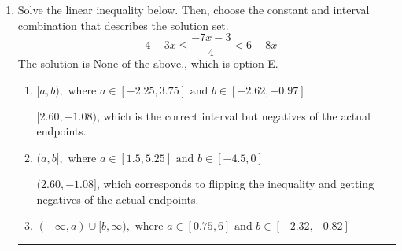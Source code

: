 \documentclass{extbook}[14pt]
\newcommand{\litem}[1]{\item #1

\rule{\textwidth}{0.4pt}}
\begin{document}
\begin{enumerate}
{\begin{enumerate}[label=\Alph*.]
$[15.50, 3.71)$, which corresponds to flipping the inequality and getting negatives of the actual endpoints.
\item \( (-\infty, a) \cup [b, \infty), \text{ where } a \in [13.5, 21] \text{ and } b \in [2.25, 5.25] \)

$(-\infty, 15.50) \cup [3.71, \infty)$, which corresponds to displaying the and-inequality as an or-inequality and getting negatives of the actual endpoints.
\item \( (a, b], \text{ where } a \in [12, 18.75] \text{ and } b \in [3, 6.75] \)

$(15.50, 3.71]$, which is the correct interval but negatives of the actual endpoints.
\item \( (-\infty, a] \cup (b, \infty), \text{ where } a \in [12.75, 18] \text{ and } b \in [-0.75, 11.25] \)

$(-\infty, 15.50] \cup (3.71, \infty)$, which corresponds to displaying the and-inequality as an or-inequality AND flipping the inequality AND getting negatives of the actual endpoints.
\item \( \text{None of the above.} \)

* This is correct as the answer should be $(-15.50, -3.71]$.
\end{enumerate}

\textbf{General Comment:} To solve, you will need to break up the compound inequality into two inequalities. Be sure to keep track of the inequality! It may be best to draw a number line and graph your solution.
}
\litem{
Solve the linear inequality below. Then, choose the constant and interval combination that describes the solution set.
\[ -4 - 3 x \leq \frac{-7 x - 3}{4} < 6 - 8 x \]The solution is \( \text{None of the above.} \), which is option E.\begin{enumerate}[label=\Alph*.]
\item \( [a, b), \text{ where } a \in [-2.25, 3.75] \text{ and } b \in [-2.62, -0.97] \)

$[2.60, -1.08)$, which is the correct interval but negatives of the actual endpoints.
\item \( (a, b], \text{ where } a \in [1.5, 5.25] \text{ and } b \in [-4.5, 0] \)

$(2.60, -1.08]$, which corresponds to flipping the inequality and getting negatives of the actual endpoints.
\item \( (-\infty, a) \cup [b, \infty), \text{ where } a \in [0.75, 6] \text{ and } b \in [-2.32, -0.82] \)


\end{enumerate}}
\end{enumerate}
\end{document}
